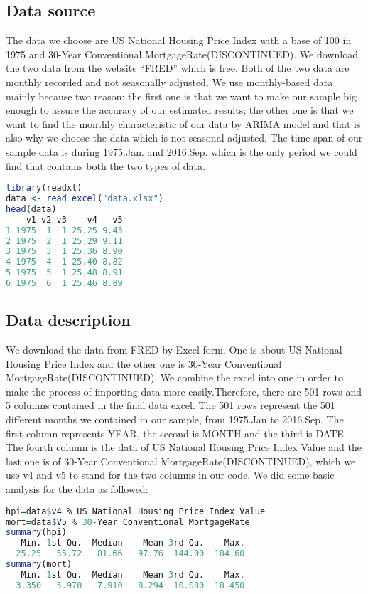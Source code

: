 \documentclass[12pt,letterpaper]{article}
\newcommand{\mymarginnote}[2]{\marginnote{\parbox[t]{\marginparwidth}{\scriptsize \textcolor{#1}{#2}}}}
\begin{document}
\subsection{Data source}
The data we choose are US National Housing Price Index with a base of 100 in 1975 and 30-Year Conventional MortgageRate(DISCONTINUED). 
We download the two data from the website ``FRED'' which is free. 
Both of the two data are monthly recorded and not seasonally adjusted. 
We use monthly-based data mainly because two reason: the first one is that we want to make our sample big enough to assure the accuracy of our estimated results; the other one is that we  want to find the monthly characteristic of our data by ARIMA model and that is also why we choose the data which is not seasonal adjusted.
The time span of our sample data is during 1975.Jan. and 2016.Sep. which is the only period we could find that contains both the two types of data.

\mymarginnote{red}{This is your trick to include R code. It's OK. But I prefer you include the code in a Rmarkdown file or a Rnw file}

{\footnotesize
\begin{lstlisting}[language=R]
library(readxl)
data <- read_excel("data.xlsx")
head(data)
    v1 v2 v3    v4   v5
1 1975  1  1 25.25 9.43
2 1975  2  1 25.29 9.11
3 1975  3  1 25.36 8.90
4 1975  4  1 25.40 8.82
5 1975  5  1 25.48 8.91
6 1975  6  1 25.46 8.89
\end{lstlisting}
}

\subsection{Data description}
We download the data from FRED by Excel form. One is about US National Housing Price Index and the other one is 30-Year Conventional MortgageRate(DISCONTINUED).
We combine the excel into one in order to make the process of importing data more easily.Therefore, there are 501 rows and 5 columns contained in the final data excel.
The 501 rows represent the 501 different months we contained in our sample, from 1975.Jan to 2016.Sep.
The first column represents YEAR, the second is MONTH and the third is DATE.
The fourth column is the data of US National Housing Price Index Value and the last one is of 30-Year Conventional MortgageRate(DISCONTINUED), which we use v4 and v5 to stand for the two columns in our code.
We did some basic analysis for the data as followed:

{\footnotesize
\begin{lstlisting}[language=R]
hpi=data$v4 % US National Housing Price Index Value
mort=data$V5 % 30-Year Conventional MortgageRate
summary(hpi)
   Min. 1st Qu.  Median    Mean 3rd Qu.    Max. 
  25.25   55.72   81.66   97.76  144.00  184.60 
summary(mort)
   Min. 1st Qu.  Median    Mean 3rd Qu.    Max. 
  3.350   5.970   7.910   8.294  10.080  18.450
\end{lstlisting}
}
         
\end{document}
